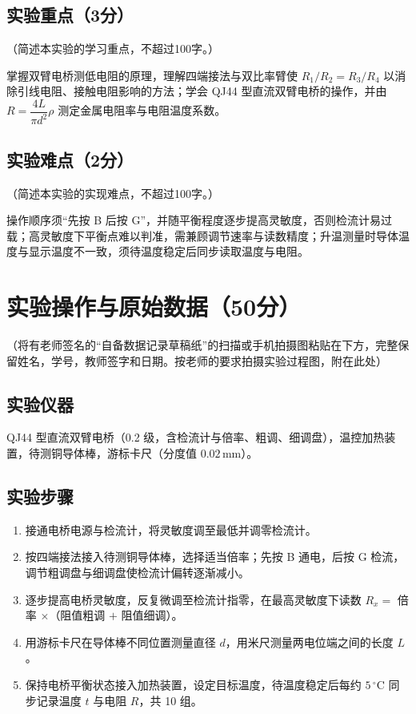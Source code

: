 \documentclass{Phyport}
\begin{document}
\subsection{实验重点（3分）}
（简述本实验的学习重点，不超过100字。）

掌握双臂电桥测低电阻的原理，理解四端接法与双比率臂使 $R_1/R_2=R_3/R_4$ 以消除引线电阻、接触电阻影响的方法；学会 QJ44 型直流双臂电桥的操作，并由 $R=\dfrac{4L}{\pi d^2}\rho$ 测定金属电阻率与电阻温度系数。

\subsection{实验难点（2分）}
（简述本实验的实现难点，不超过100字。）

操作顺序须“先按 B 后按 G”，并随平衡程度逐步提高灵敏度，否则检流计易过载；高灵敏度下平衡点难以判准，需兼顾调节速率与读数精度；升温测量时导体温度与显示温度不一致，须待温度稳定后同步读取温度与电阻。

\section{实验操作与原始数据（50分）}
（将有老师签名的“自备数据记录草稿纸”的扫描或手机拍摄图粘贴在下方，完整保留姓名，学号，教师签字和日期。按老师的要求拍摄实验过程图，附在此处）

\subsection{实验仪器}

QJ44 型直流双臂电桥（0.2 级，含检流计与倍率、粗调、细调盘），温控加热装置，待测铜导体棒，游标卡尺（分度值 $0.02\,\mathrm{mm}$）。

\subsection{实验步骤}

\begin{enumerate}
    \item 接通电桥电源与检流计，将灵敏度调至最低并调零检流计。
    \item 按四端接法接入待测铜导体棒，选择适当倍率；先按 B 通电，后按 G 检流，调节粗调盘与细调盘使检流计偏转逐渐减小。
    \item 逐步提高电桥灵敏度，反复微调至检流计指零，在最高灵敏度下读数 $R_x=$ 倍率 $\times$（阻值粗调 $+$ 阻值细调）。
    \item 用游标卡尺在导体棒不同位置测量直径 $d$，用米尺测量两电位端之间的长度 $L$。
    \item 保持电桥平衡状态接入加热装置，设定目标温度，待温度稳定后每约 $5\,^\circ\mathrm{C}$ 同步记录温度 $t$ 与电阻 $R$，共 10 组。
\end{enumerate}
\end{document}
